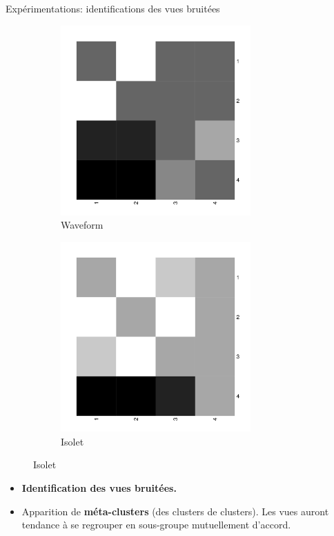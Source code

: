 \documentclass[hyperref={pdfpagelabels=false}]{beamer}
\begin{document}
\begin{frame}{Expérimentations: identifications des vues bruitées}
\begin{figure}[b]
\begin{subfigure}[b]{0.32\textwidth}
                \includegraphics[width=0.8\textwidth]{waveform_bw}
                \caption{Waveform}
            \end{subfigure}
            \begin{subfigure}[b]{0.32\textwidth}
                \centering
                \includegraphics[width=0.8\textwidth]{isolet_bw}
                \caption{Isolet}
            \end{subfigure}
        \end{figure}

        \begin{itemize}
            \item\textbf{Identification des vues bruitées.}
            \item Apparition de \textbf{méta-clusters} (des clusters de 
                clusters). Les vues auront tendance à se regrouper en 
                sous-groupe mutuellement d'accord.
        \end{itemize}
    \end{frame}
\end{document}
